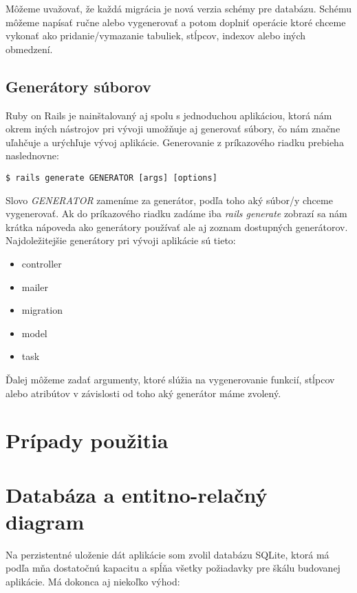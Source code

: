 Môžeme uvažovať, že každá migrácia je nová verzia schémy pre databázu. Schému môžeme napísať ručne alebo vygenerovať a potom doplniť operácie ktoré chceme vykonať ako pridanie/vymazanie tabuliek, stĺpcov, indexov alebo iných obmedzení.

\subsection*{Generátory súborov}

Ruby on Rails je nainštalovaný aj spolu s jednoduchou aplikáciou, ktorá nám okrem iných nástrojov pri vývoji umožňuje aj generovať súbory, čo nám značne uľahčuje a urýchľuje vývoj aplikácie. Generovanie z príkazového riadku prebieha naslednovne:

\begin{verbatim}
$ rails generate GENERATOR [args] [options]
\end{verbatim}

Slovo \emph{GENERATOR} zameníme za generátor, podľa toho aký súbor/y chceme vygenerovať. Ak do príkazového riadku zadáme iba \emph{rails generate} zobrazí sa nám krátka nápoveda ako generátory používať ale aj zoznam dostupných generátorov. Najdoležitejšie generátory pri vývoji aplikácie sú tieto:

\begin{itemize}
  \item controller
  \item mailer
  \item migration
  \item model
  \item task
\end{itemize}

Ďalej môžeme zadať argumenty, ktoré slúžia na vygenerovanie funkcií, stĺpcov alebo atribútov v závislosti od toho aký generátor máme zvolený.


\clearpage
\section{Prípady použitia}

\clearpage
\section{Databáza a entitno-relačný diagram}

\clearpage
Na perzistentné uloženie dát aplikácie som zvolil databázu SQLite, ktorá má podľa mňa dostatočnú kapacitu a spĺňa všetky požiadavky pre škálu budovanej aplikácie. Má dokonca aj niekoľko výhod:

